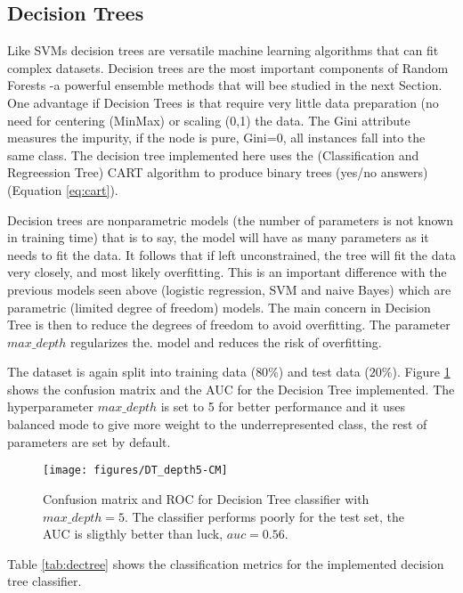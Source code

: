 \documentclass[11pt]{article}
\theoremstyle{definition}
\theoremstyle{remark}
\begin{document}
\subsection{Decision Trees}
\label{se:resdectree}
Like SVMs decision trees are versatile machine learning algorithms that can fit complex datasets. Decision trees are the most important components of Random Forests -a powerful ensemble methods that will bee studied in the next Section.
One advantage if Decision Trees is that require very little data preparation (no need for centering (MinMax) or scaling (0,1) the data.
The Gini attribute measures the impurity, if the node is pure, Gini=0, all instances fall into the same class.
The decision tree implemented here uses the (Classification and Regreession Tree) CART algorithm to produce binary trees (yes/no answers) (Equation \ref{eq:cart}).
 
Decision trees are nonparametric models (the number of parameters is not known in training time) that is to say, the model will have as many parameters as it needs to fit the data. It follows that if left unconstrained, the tree will fit the data very closely, and most likely overfitting. This is an important difference with the previous models seen above (logistic regression, SVM and naive Bayes) which are parametric (limited degree of freedom) models. 
The main concern in Decision Tree is then to reduce the degrees of freedom to avoid overfitting. The parameter $max\_depth$ regularizes the. model and reduces the risk of overfitting.

The dataset is again split into training data ($80\%$) and test data ($20\%$). Figure \ref{fig:dt-md5} shows the confusion matrix and the AUC for the Decision Tree implemented. The hyperparameter $max\_depth$ is set to 5 for better performance and it uses balanced mode to give more weight to the underrepresented class, the rest of parameters are set by default.
\begin{figure}[H]
        \centering
        \texttt{[image: figures/DT\_depth5-CM]}
        \caption{Confusion matrix and ROC for Decision Tree classifier with $max\_depth=5$. The classifier performs poorly for the test set, the AUC is sligthly better than luck, $auc=0.56$.
        } \label{fig:dt-md5}
\end{figure}

Table \ref{tab:dectree} shows the classification metrics for the implemented decision tree classifier.
\end{document}
